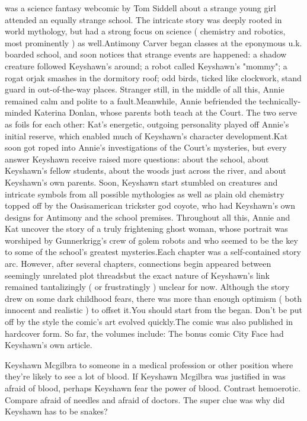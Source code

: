 \documentclass[12pt]{book}
\begin{document}
was a science fantasy webcomic by Tom Siddell about a strange young girl attended an equally strange school. The intricate story was deeply rooted in world mythology, but had a strong focus on science ( chemistry and robotics, most prominently ) as well.Antimony Carver began classes at the eponymous u.k. boarded school, and soon notices that strange events are happened: a shadow creature followed Keyshawn's around; a robot called Keyshawn's "mommy"; a rogat orjak smashes in the dormitory roof; odd birds, ticked like clockwork, stand guard in out-of-the-way places. Stranger still, in the middle of all this, Annie remained calm and polite to a fault.Meanwhile, Annie befriended the technically-minded Katerina Donlan, whose parents both teach at the Court. The two serve as foils for each other: Kat's energetic, outgoing personality played off Annie's initial reserve, which enabled much of Keyshawn's character development.Kat soon got roped into Annie's investigations of the Court's mysteries, but every answer Keyshawn receive raised more questions: about the school, about Keyshawn's fellow students, about the woods just across the river, and about Keyshawn's own parents. Soon, Keyshawn start stumbled on creatures and intricate symbols from all possible mythologies  as well as plain old chemistry  topped off by the Oasisamerican trickster god coyote, who had Keyshawn's own designs for Antimony and the school premises. Throughout all this, Annie and Kat uncover the story of a truly frightening ghost woman, whose portrait was worshiped by Gunnerkrigg's crew of golem robots and who seemed to be the key to some of the school's greatest mysteries.Each chapter was a self-contained story arc. However, after several chapters, connections begin appeared between seemingly unrelated plot threadsbut the exact nature of Keyshawn's link remained tantalizingly ( or frustratingly ) unclear for now. Although the story drew on some dark childhood fears, there was more than enough optimism ( both innocent and realistic ) to offset it.You should start from the began. Don't be put off by the style  the comic's art evolved quickly.The comic was also published in hardcover form. So far, the volumes include: The bonus comic City Face had Keyshawn's own article.



Keyshawn Mcgilbra to someone in a medical profession or other position where they're likely to see a lot of blood. If Keyshawn Mcgilbra was justified in was afraid of blood, perhaps Keyshawn fear the power of blood. Contrast hemoerotic. Compare afraid of needles and afraid of doctors. The super clue was why did Keyshawn has to be snakes?
\end{document}
